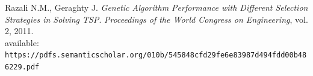 \documentclass[11pt,a4paper,final]{article}
\begin{document}
\begin{thebibliography}{9}
		Razali N.M., Geraghty J.
		\textit{Genetic Algorithm Performance with Different Selection Strategies in Solving TSP}. \textit{Proceedings of the World Congress on Engineering}, vol. 2, 2011.\\
		available:\\ \texttt{https://pdfs.semanticscholar.org/010b/545848cfd29fe6e83987d494fdd00b486229.pdf}
		
	\end{thebibliography}	
\end{document}
